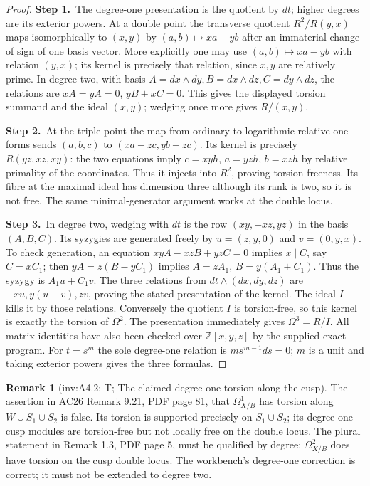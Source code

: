 \documentclass[11pt,a4paper]{article}
\theoremstyle{plain}
\theoremstyle{definition}
\newtheorem{remark}[theorem]{Remark}
\newcommand{\uses}[1]{\par\noindent{\small\textsf{Uses:} #1}\par\smallskip}
\begin{document}
\begin{proof}
\par\smallskip\noindent\textbf{Step 1.}\ The degree-one presentation is the quotient by $dt$; higher degrees
are its exterior powers.  At a double point the transverse quotient
$R^2/R(y,x)$ maps isomorphically to $(x,y)$ by
$(a,b)\mapsto xa-yb$ after an immaterial change of sign of one
basis vector.  More explicitly one may use
$(a,b)\mapsto xa-yb$ with relation $(y,x)$; its kernel is precisely
that relation, since $x,y$ are relatively prime.  In degree two,
with basis $A=dx\wedge dy,B=dx\wedge dz,C=dy\wedge dz$, the
relations are $xA=yA=0$, $yB+xC=0$.  This gives the displayed
torsion summand and the ideal $(x,y)$; wedging once more gives
$R/(x,y)$.

\par\smallskip\noindent\textbf{Step 2.}\ At the triple point the map from ordinary to logarithmic relative
one-forms sends $(a,b,c)$ to $(xa-zc,yb-zc)$.
Its kernel is precisely $R(yz,xz,xy)$: the two equations imply
$c=xyh$, $a=yzh$, $b=xzh$ by relative primality of the coordinates.
Thus it injects into $R^2$, proving torsion-freeness.  Its fibre at
the maximal ideal has dimension three although its rank is two,
so it is not free.  The same minimal-generator argument works at
the double locus.

\par\smallskip\noindent\textbf{Step 3.}\ In degree two, wedging with $dt$ is the row
$(xy,-xz,yz)$ in the basis $(A,B,C)$.
Its syzygies are generated freely by
$u=(z,y,0)$ and $v=(0,y,x)$.
To check generation, an equation $xyA-xzB+yzC=0$ implies
$x\mid C$, say $C=xC_1$; then $yA=z(B-yC_1)$ implies
$A=zA_1$, $B=y(A_1+C_1)$.  Thus the syzygy is $A_1u+C_1v$.
The three relations from $dt\wedge(dx,dy,dz)$ are
$-xu,y(u-v),zv$, proving the stated presentation of the kernel.
The ideal $I$ kills it by those relations.  Conversely the quotient
$I$ is torsion-free, so this kernel is exactly the torsion of
$\Omega^2$.  The presentation immediately gives $\Omega^3=R/I$.
All matrix identities have also been checked over $\mathbb Z[x,y,z]$ by
the supplied exact program.  For $t=s^m$ the sole degree-one
relation is $ms^{m-1}ds=0$; $m$ is a unit and taking exterior
powers gives the three formulas.
\end{proof}

\begin{remark}[inv:A4.2; T; The claimed degree-one torsion along the cusp]\label{inv:A4.2}
The assertion in AC26 Remark 9.21, PDF page 81, that
$\Omega_{X/B}^1$ has torsion along $W\cup S_1\cup S_2$ is false.
Its torsion is supported precisely on $S_1\cup S_2$; its degree-one
cusp modules are torsion-free but not locally free on the double
locus.  The plural statement in Remark 1.3, PDF page 5, must be
qualified by degree: $\Omega^2_{X/B}$ does have torsion on the cusp
double locus.  The workbench's degree-one correction is correct;
it must not be extended to degree two.
\end{remark}
\uses{inv:A4.1; \cite[Remarks 1.3 and 9.21]{AC26}.}
\end{document}
